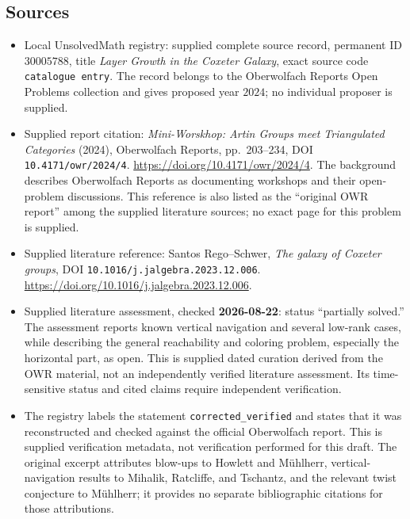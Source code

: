 \documentclass[11pt]{article}
\begin{document}
\subsection{Sources}
\begin{itemize}
\item Local UnsolvedMath registry: supplied complete source record, permanent ID \(30005788\), title \emph{Layer Growth in the Coxeter Galaxy}, exact source code \texttt{catalogue entry}. The record belongs to the Oberwolfach Reports Open Problems collection and gives proposed year \(2024\); no individual proposer is supplied.
\item Supplied report citation: \emph{Mini-Worskhop: Artin Groups meet Triangulated Categories} (2024), Oberwolfach Reports, pp.\ 203--234, DOI \texttt{10.4171/owr/2024/4}. \url{https://doi.org/10.4171/owr/2024/4}. The background describes Oberwolfach Reports as documenting workshops and their open-problem discussions. This reference is also listed as the ``original OWR report'' among the supplied literature sources; no exact page for this problem is supplied.
\item Supplied literature reference: Santos Rego--Schwer, \emph{The galaxy of Coxeter groups}, DOI \texttt{10.1016/j.jalgebra.2023.12.006}. \url{https://doi.org/10.1016/j.jalgebra.2023.12.006}.
\item Supplied literature assessment, checked \textbf{2026-08-22}: status ``partially solved.'' The assessment reports known vertical navigation and several low-rank cases, while describing the general reachability and coloring problem, especially the horizontal part, as open. This is supplied dated curation derived from the OWR material, not an independently verified literature assessment. Its time-sensitive status and cited claims require independent verification.
\item The registry labels the statement \texttt{corrected\_verified} and states that it was reconstructed and checked against the official Oberwolfach report. This is supplied verification metadata, not verification performed for this draft. The original excerpt attributes blow-ups to Howlett and Mühlherr, vertical-navigation results to Mihalik, Ratcliffe, and Tschantz, and the relevant twist conjecture to Mühlherr; it provides no separate bibliographic citations for those attributions.
\end{itemize}
\end{document}
